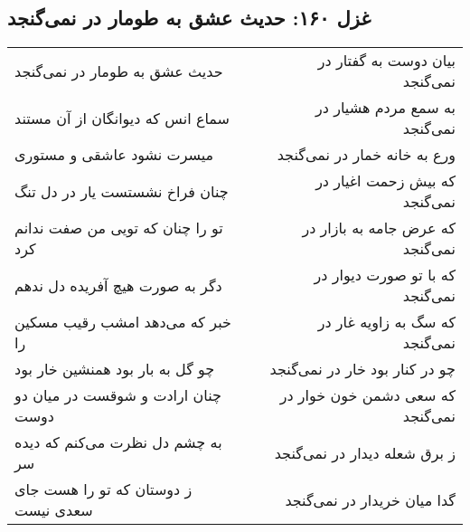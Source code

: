 \begin{center}
\section*{غزل ۱۶۰: حدیث عشق به طومار در نمی‌گنجد}
\label{sec:160}
\begin{longtable}{l p{0.5cm} r}
حدیث عشق به طومار در نمی‌گنجد
&&
بیان دوست به گفتار در نمی‌گنجد
\\
سماع انس که دیوانگان از آن مستند
&&
به سمع مردم هشیار در نمی‌گنجد
\\
میسرت نشود عاشقی و مستوری
&&
ورع به خانه خمار در نمی‌گنجد
\\
چنان فراخ نشستست یار در دل تنگ
&&
که بیش زحمت اغیار در نمی‌گنجد
\\
تو را چنان که تویی من صفت ندانم کرد
&&
که عرض جامه به بازار در نمی‌گنجد
\\
دگر به صورت هیچ آفریده دل ندهم
&&
که با تو صورت دیوار در نمی‌گنجد
\\
خبر که می‌دهد امشب رقیب مسکین را
&&
که سگ به زاویه غار در نمی‌گنجد
\\
چو گل به بار بود همنشین خار بود
&&
چو در کنار بود خار در نمی‌گنجد
\\
چنان ارادت و شوقست در میان دو دوست
&&
که سعی دشمن خون خوار در نمی‌گنجد
\\
به چشم دل نظرت می‌کنم که دیده سر
&&
ز برق شعله دیدار در نمی‌گنجد
\\
ز دوستان که تو را هست جای سعدی نیست
&&
گدا میان خریدار در نمی‌گنجد
\\
\end{longtable}
\end{center}

